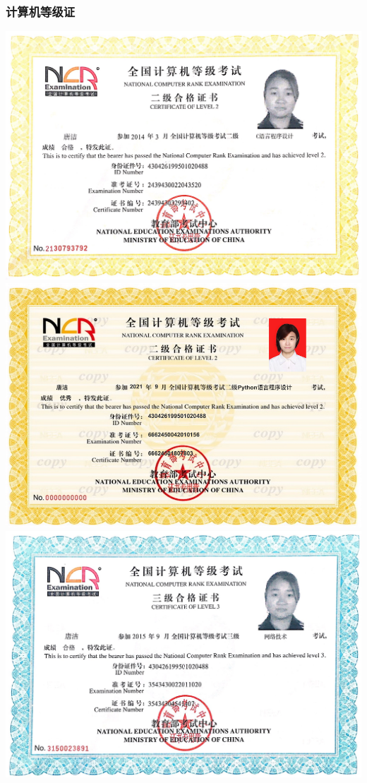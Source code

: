 \documentclass[UFT8]{ctexart}%
\begin{document}
\subsubsection{计算机等级证}
\begin{center}
\includegraphics[scale=0.23]{figs/计算机二级C.JPG }
\includegraphics[scale=0.46]{figs/计算机二级Python.JPG }
\includegraphics[scale=0.22]{figs/计算机三级证书.JPG }
\end{center}
 
\end{document}
